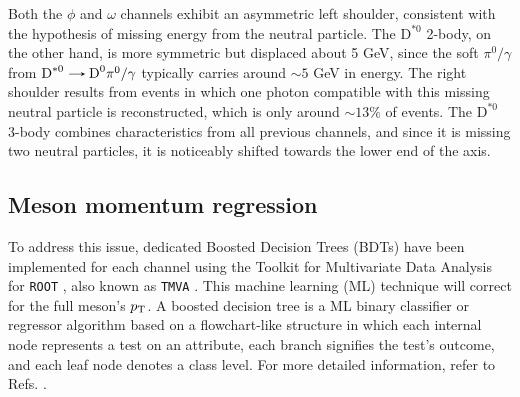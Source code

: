 Both the $\phi$ and $\omega$ channels exhibit an asymmetric left shoulder, consistent with the hypothesis of missing energy from the neutral particle. The $\text{D}^{*0}$ 2-body, on the other hand, is more symmetric but displaced about 5 GeV, since the soft $\pi^{0}/\gamma$ from $\text{D}^{*0}\decaysto \text{D}^{0}\pi^{0}/\gamma$ typically carries around $\sim5$ GeV in energy. The right shoulder results from events in which one photon compatible with this missing neutral particle is reconstructed, which is only around $\sim 13\%$ of events. The $\text{D}^{*0}$ 3-body combines characteristics from all previous channels, and since it is missing two neutral particles, it is noticeably shifted towards the lower end of the axis.

\subsection{Meson momentum regression}

To address this issue, dedicated Boosted Decision Trees (BDTs) have been implemented for each channel using the Toolkit for Multivariate Data Analysis for \verb+ROOT+ \cite{CERN:root}, also known as \verb+TMVA+ \cite{TMVA:2007ngy}. This machine learning (ML) technique will correct for the full meson's $p_\text{T}$. A boosted decision tree is a ML binary classifier or regressor algorithm based on a flowchart-like structure in which each internal node represents a test on an attribute, each branch signifies the test's outcome, and each leaf node denotes a class level. For more detailed information, refer to Refs. \cite{TMVA:2007ngy, Coadou:2022nsh}.

